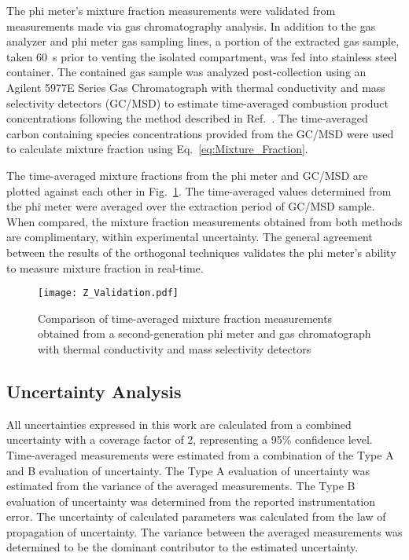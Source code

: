 \documentclass[12pt,letterpaper]{article}
\begin{document}
\begin{flushleft}
The phi meter's mixture fraction measurements were validated from measurements made via gas chromatography analysis. In addition to the gas analyzer and phi meter gas sampling lines, a portion of the extracted gas sample, taken 60~s prior to venting the isolated compartment, was fed into stainless steel container. The contained gas sample was analyzed post-collection using an Agilent 5977E Series Gas Chromatograph with thermal conductivity and mass selectivity detectors (GC/MSD) to estimate time-averaged combustion product concentrations following the method described in Ref.~\cite{falkenstein2022calibration}. The time-averaged carbon containing species concentrations provided from the GC/MSD were used to calculate mixture fraction using Eq.~\ref{eq:Mixture_Fraction}.

The time-averaged mixture fractions from the phi meter and GC/MSD are plotted against each other in Fig.~\ref{fig:Z_Val}. The time-averaged values determined from the phi meter were averaged over the extraction period of GC/MSD sample. When compared, the mixture fraction measurements obtained from both methods are complimentary, within experimental uncertainty. The general agreement between the results of the orthogonal techniques validates the phi meter's ability to measure mixture fraction in real-time. 

\begin{figure}[h!]
	\centering
\texttt{[image: Z\_Validation.pdf]}
	\caption[]{Comparison of time-averaged mixture fraction measurements obtained from a second-generation phi meter and gas chromatograph with thermal conductivity and mass selectivity detectors}
	\label{fig:Z_Val}
\end{figure}

\subsection{Uncertainty Analysis} \addvspace{10pt}
All uncertainties expressed in this work are calculated from a combined uncertainty with a coverage factor of 2, representing a 95\% confidence level. Time-averaged measurements were estimated from a combination of the Type A and B evaluation of uncertainty. The Type A evaluation of uncertainty was estimated from the variance of the averaged measurements. The Type B evaluation of uncertainty was determined from the reported instrumentation error. The uncertainty of calculated parameters was calculated from the law of propagation of uncertainty. The variance between the averaged measurements was determined to be the dominant contributor to the estimated uncertainty.


\end{flushleft}
\end{document}
